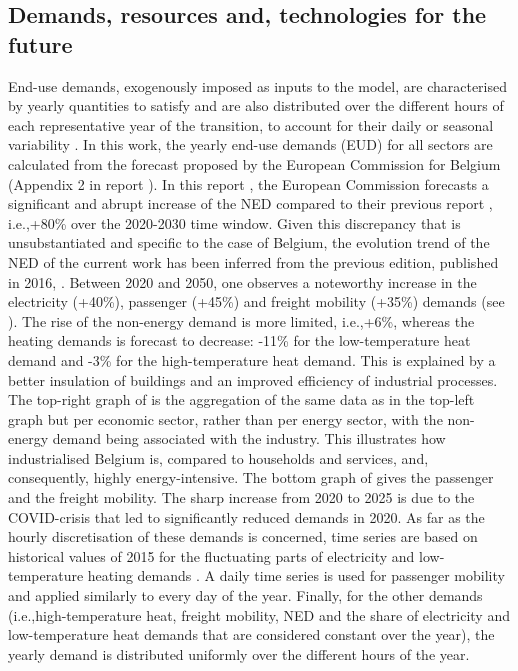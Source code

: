 \documentclass[11pt,twoside,a4paper,english]{article}
\def\ie{i.e.,}
\begin{document}
\begin{appendices}
\subsection{Demands, resources and, technologies for the future}
\label{app:dem_res_tech}
End-use demands, exogenously imposed as inputs to the model, are characterised by yearly quantities to satisfy and are also distributed over the different hours of each representative year of the transition, to account for their daily or seasonal variability \cite{Limpens2020,limpens2021generating}. In this work, the yearly end-use demands (EUD) for all sectors are calculated from the forecast proposed by the European Commission for Belgium (Appendix 2 in report \cite{EuropeanCommission2021}).  In this report \cite{EuropeanCommission2021}, the European Commission forecasts a significant and abrupt increase of the \gls{NED} compared to their previous report \cite{EuropeanCommission2016}, \ie +80\% over the 2020-2030 time window. Given this discrepancy that is unsubstantiated and specific to the case of Belgium, the evolution trend of the \gls{NED} of the current work has been inferred from the previous edition, published in 2016, \cite{EuropeanCommission2016}. Between 2020 and 2050, one observes a noteworthy increase in the electricity (+40\%), passenger (+45\%) and freight mobility (+35\%) demands (see ). The rise of the non-energy demand is more limited, \ie +6\%, whereas the heating demands is forecast to decrease: -11\% for the low-temperature heat demand and -3\% for the high-temperature heat demand. This is explained by a better insulation of buildings and an improved efficiency of industrial processes. The top-right graph of  is the aggregation of the same data as in the top-left graph but per economic sector, rather than per energy sector, with the non-energy demand being associated with the industry. This illustrates how industrialised Belgium is, compared to households and services, and, consequently, highly energy-intensive. The bottom graph of  gives the passenger and the freight mobility. The sharp increase from 2020 to 2025 is due to the COVID-crisis that led to significantly reduced demands in 2020. As far as the hourly discretisation of these demands is concerned, time series are based on historical values of 2015 for the fluctuating parts of electricity and low-temperature heating demands \cite{Limpens2020}. A daily time series is used for passenger mobility and applied similarly to every day of the year. Finally, for the other demands (\ie high-temperature heat, freight mobility, \gls{NED} and the share of electricity and low-temperature heat demands that are considered constant over the year), the yearly demand is distributed uniformly over the different hours of the year.


\end{appendices}
\end{document}
